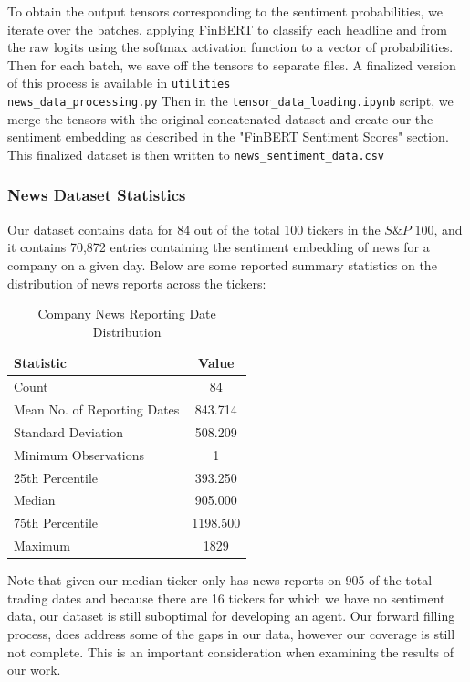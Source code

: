 To obtain the output tensors corresponding to the sentiment probabilities, we iterate over the batches, applying FinBERT to classify each headline and from the raw logits using the softmax activation function to a vector of probabilities.
Then for each batch, we save off the tensors to separate files. A finalized version of this process is available in \texttt{utilities\\news\_data\_processing.py}
Then in the \texttt{tensor\_data\_loading.ipynb} script, we merge the tensors with the original concatenated dataset and create our the sentiment embedding as described in the "FinBERT Sentiment Scores" section. 
This finalized dataset is then written to \texttt{news\_sentiment\_data.csv}

\subsubsection{News Dataset Statistics}

Our dataset contains data for 84 out of the total 100 tickers in the $S\&P$ 100, and it contains 70,872 entries containing the sentiment embedding of news for a company on a given day. Below are some reported summary statistics on the distribution of news reports across the tickers:

\begin{table}[htbp]
    \centering
    \caption{Company News Reporting Date Distribution}
    \begin{tabular}{l c}
        \toprule
        \textbf{Statistic} & \textbf{Value} \\
        \midrule
        Count & 84 \\
        Mean No. of Reporting Dates & 843.714 \\
        Standard Deviation & 508.209 \\
        Minimum Observations & 1 \\
        25th Percentile & 393.250 \\
        Median & 905.000 \\
        75th Percentile & 1198.500 \\
        Maximum & 1829 \\
        \bottomrule
    \end{tabular}
\end{table}

Note that given our median ticker only has news reports on 905 of the total trading dates and because there are 16 tickers for which we have no sentiment data, our dataset is still suboptimal for developing an agent. Our forward filling process, does address some of the gaps in our data, however our coverage is still not complete.
This is an important consideration when examining the results of our work.

